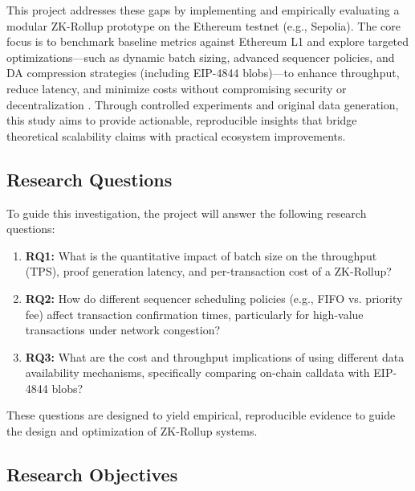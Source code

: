 \vspace{12pt}
This project addresses these gaps by implementing and empirically evaluating a modular ZK-Rollup prototype on the Ethereum testnet (e.g., Sepolia). The core focus is to benchmark baseline metrics against Ethereum L1 and explore targeted optimizations—such as dynamic batch sizing, advanced sequencer policies, and DA compression strategies (including EIP-4844 blobs)—to enhance throughput, reduce latency, and minimize costs without compromising security or decentralization \cite{chaliasos2024analyzing}. Through controlled experiments and original data generation, this study aims to provide actionable, reproducible insights that bridge theoretical scalability claims with practical ecosystem improvements.

\vspace{12pt}
\subsection{Research Questions}
\vspace{12pt}

To guide this investigation, the project will answer the following research questions:

\begin{enumerate}
    \item \textbf{RQ1:} What is the quantitative impact of batch size on the throughput (TPS), proof generation latency, and per-transaction cost of a ZK-Rollup?
    \item \textbf{RQ2:} How do different sequencer scheduling policies (e.g., FIFO vs. priority fee) affect transaction confirmation times, particularly for high-value transactions under network congestion?
    \item \textbf{RQ3:} What are the cost and throughput implications of using different data availability mechanisms, specifically comparing on-chain calldata with EIP-4844 blobs?
\end{enumerate}
These questions are designed to yield empirical, reproducible evidence to guide the design and optimization of ZK-Rollup systems.

\vspace{12pt}
\subsection{Research Objectives}
\vspace{12pt}

